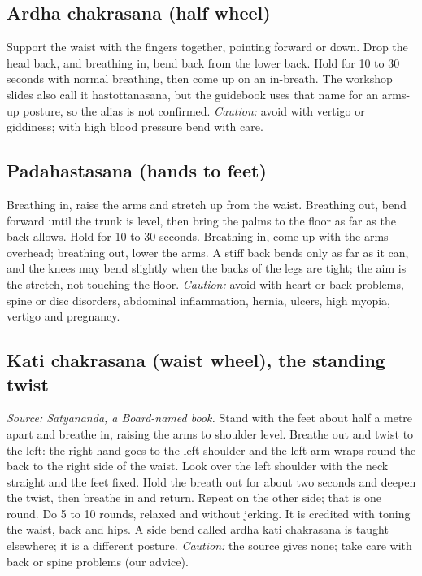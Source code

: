 \subsection*{Ardha chakrasana (half wheel)}
Support the waist with the fingers together, pointing forward or down. Drop the head back, and breathing in, bend back from the lower back. Hold for 10 to 30 seconds with normal breathing, then come up on an in-breath. The workshop slides also call it hastottanasana, but the guidebook uses that name for an arms-up posture, so the alias is not confirmed.
\textit{Caution:} avoid with vertigo or giddiness; with high blood pressure bend with care.

\subsection*{Padahastasana (hands to feet)}
Breathing in, raise the arms and stretch up from the waist. Breathing out, bend forward until the trunk is level, then bring the palms to the floor as far as the back allows. Hold for 10 to 30 seconds. Breathing in, come up with the arms overhead; breathing out, lower the arms. A stiff back bends only as far as it can, and the knees may bend slightly when the backs of the legs are tight; the aim is the stretch, not touching the floor.
\textit{Caution:} avoid with heart or back problems, spine or disc disorders, abdominal inflammation, hernia, ulcers, high myopia, vertigo and pregnancy.

\subsection*{Kati chakrasana (waist wheel), the standing twist}
\textit{Source: Satyananda, a Board-named book.} Stand with the feet about half a metre apart and breathe in, raising the arms to shoulder level. Breathe out and twist to the left: the right hand goes to the left shoulder and the left arm wraps round the back to the right side of the waist. Look over the left shoulder with the neck straight and the feet fixed. Hold the breath out for about two seconds and deepen the twist, then breathe in and return. Repeat on the other side; that is one round. Do 5 to 10 rounds, relaxed and without jerking. It is credited with toning the waist, back and hips. A side bend called ardha kati chakrasana is taught elsewhere; it is a different posture.
\textit{Caution:} the source gives none; take care with back or spine problems (our advice).

